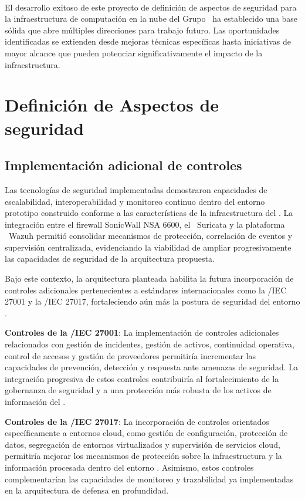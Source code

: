 \label{cap:trabajos-futuros}
\mbox{}\\

El desarrollo exitoso de este proyecto de definición de aspectos de seguridad para la infraestructura de computación en la nube del Grupo 
\GRID\ ha establecido una base sólida que abre múltiples direcciones para trabajo futuro. Las oportunidades identificadas se extienden desde 
mejoras técnicas específicas hasta iniciativas de mayor alcance que pueden potenciar significativamente el impacto de la infraestructura.

\section{Definición de Aspectos de seguridad}
\noindent

\subsection{Implementación adicional de controles}
\noindent

Las tecnologías de seguridad implementadas demostraron capacidades de escalabilidad, interoperabilidad y monitoreo continuo dentro del 
entorno prototipo construido conforme a las características de la infraestructura del \GRID. La integración entre el firewall SonicWall 
NSA 6600, el \IDPS\ Suricata y la plataforma \SIEM\ Wazuh permitió consolidar mecanismos de protección, correlación de eventos y supervisión 
centralizada, evidenciando la viabilidad de ampliar progresivamente las capacidades de seguridad de la arquitectura propuesta.

Bajo este contexto, la arquitectura planteada habilita la futura incorporación de controles adicionales pertenecientes a estándares 
internacionales como la \ISO/IEC 27001 y la \ISO/IEC 27017, fortaleciendo aún más la postura de seguridad del entorno \GRID.

\textbf{Controles de la \ISO/IEC 27001}: La implementación de controles adicionales relacionados con gestión de incidentes, gestión de 
activos, continuidad operativa, control de accesos y gestión de proveedores permitiría incrementar las capacidades de prevención, 
detección y respuesta ante amenazas de seguridad. La integración progresiva de estos controles contribuiría al fortalecimiento de la 
gobernanza de seguridad y a una protección más robusta de los activos de información del \GRID.

\textbf{Controles de la \ISO/IEC 27017}: La incorporación de controles orientados específicamente a entornos cloud, como gestión de 
configuración, protección de datos, segregación de entornos virtualizados y supervisión de servicios cloud, permitiría mejorar los 
mecanismos de protección sobre la infraestructura y la información procesada dentro del entorno \GRID. Asimismo, estos controles 
complementarían las capacidades de monitoreo y trazabilidad ya implementadas en la arquitectura de defensa en profundidad.

